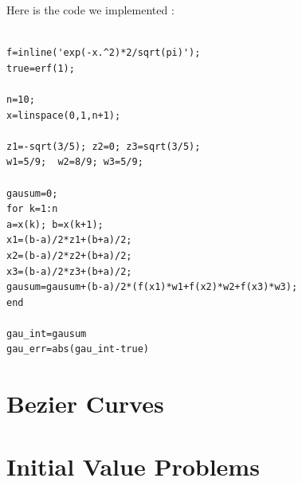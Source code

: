 \documentclass[paper=a4, fontsize=11pt]{scrartcl}
\begin{document}
Here is the code we implemented : \\

\begin{lstlisting}[caption = 'gauss\_quad.m']

f=inline('exp(-x.^2)*2/sqrt(pi)');
true=erf(1);

n=10;
x=linspace(0,1,n+1);

z1=-sqrt(3/5); z2=0; z3=sqrt(3/5);
w1=5/9;  w2=8/9; w3=5/9;

gausum=0;
for k=1:n
a=x(k); b=x(k+1);
x1=(b-a)/2*z1+(b+a)/2;
x2=(b-a)/2*z2+(b+a)/2;
x3=(b-a)/2*z3+(b+a)/2;
gausum=gausum+(b-a)/2*(f(x1)*w1+f(x2)*w2+f(x3)*w3);
end

gau_int=gausum
gau_err=abs(gau_int-true)
\end{lstlisting}
\vspace{0.25in}

\vspace{0.25in}
\section{Bezier Curves}

\vspace{0.25in}
\section{Initial Value Problems}
\end{document}
